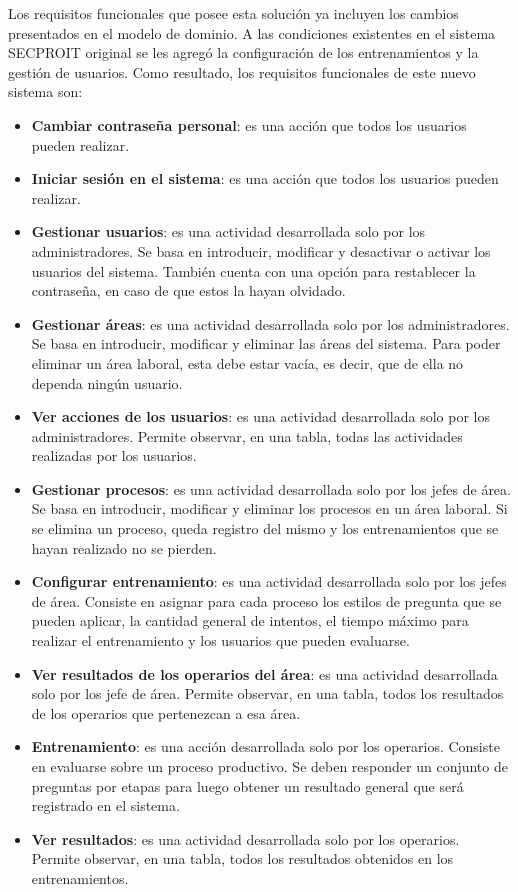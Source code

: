 Los requisitos funcionales que posee esta solución ya incluyen los cambios presentados en el modelo de dominio. A las condiciones existentes en el sistema SECPROIT original se les agregó la configuración de los entrenamientos y la gestión de usuarios. Como resultado, los requisitos funcionales de este nuevo sistema son:

\begin{itemize}
\item \textbf{Cambiar contraseña personal}: es una acción que todos los usuarios pueden realizar.
\item \textbf{Iniciar sesión en el sistema}: es una acción que todos los usuarios pueden realizar.

\item \textbf{Gestionar usuarios}: es una actividad desarrollada solo por los administradores. Se basa en introducir, modificar y desactivar o activar los usuarios del sistema. También cuenta con una opción para restablecer la contraseña, en caso de que estos la hayan olvidado.
\item \textbf{Gestionar áreas}: es una actividad desarrollada solo por los administradores. Se basa en introducir, modificar y eliminar las áreas del sistema. Para poder eliminar un área laboral, esta debe estar vacía, es decir, que de ella no dependa ningún usuario.
\item \textbf{Ver acciones de los usuarios}: es una actividad desarrollada solo por los administradores. Permite observar, en una tabla, todas las actividades realizadas por los usuarios.

\item \textbf{Gestionar procesos}: es una actividad desarrollada solo por los jefes de área. Se basa en introducir, modificar y eliminar los procesos en un área laboral. Si se elimina un proceso, queda registro del mismo y los entrenamientos que se hayan realizado no se pierden.
\item \textbf{Configurar entrenamiento}: es una actividad desarrollada solo por los jefes de área. Consiste en asignar para cada proceso los estilos de pregunta que se pueden aplicar, la cantidad general de intentos, el tiempo máximo para realizar el entrenamiento y los usuarios que pueden evaluarse.
\item \textbf{Ver resultados de los operarios del área}: es una actividad desarrollada solo por los jefe de área. Permite observar, en una tabla, todos los resultados de los operarios que pertenezcan a esa área.

\item \textbf{Entrenamiento}: es una acción desarrollada solo por los operarios. Consiste en evaluarse sobre un proceso productivo. Se deben responder un conjunto de preguntas por etapas para luego obtener un resultado general que será registrado en el sistema.
\item \textbf{Ver resultados}: es una actividad desarrollada solo por los operarios. Permite observar, en una tabla, todos los resultados obtenidos en los entrenamientos.
\end{itemize}

